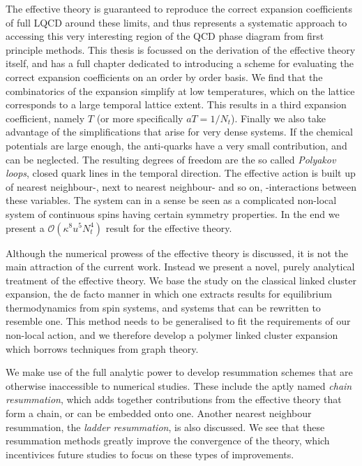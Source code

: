 {The effective theory is guaranteed to reproduce the correct expansion
coefficients of full LQCD around these limits, and thus represents a systematic
approach to accessing this very interesting region of the QCD phase diagram from
first principle methods. This thesis is focussed on the derivation of the
effective theory itself, and has a full chapter dedicated to introducing a
scheme for evaluating the correct expansion coefficients on an order by order
basis. We find that the combinatorics of the expansion simplify at low
temperatures, which on the lattice corresponds to a large temporal lattice
extent. This results in a third expansion coefficient, namely $T$ (or more
specifically $a T = 1/N_t$). Finally we also take advantage of the
simplifications that arise for very dense systems. If the chemical potentials
are large enough, the anti-quarks have a very small contribution, and can be
neglected. The resulting degrees of freedom are the so called \emph{Polyakov
  loops}, closed quark lines in the temporal direction. The effective action is
built up of nearest neighbour-, next to nearest neighbour- and so on,
-interactions between these variables. The system can in a sense be seen as a
complicated non-local system of continuous spins having certain symmetry
properties. In the end we present a $\mathcal{O}(\kappa^8 u^5 N_t^4)$ result for
the effective theory.

Although the numerical prowess of the effective theory is discussed, it is not
the main attraction of the current work. Instead we present a novel, purely
analytical treatment of the effective theory. We base the study on the classical
linked cluster expansion, the de facto manner in which one extracts results for
equilibrium thermodynamics from spin systems, and systems that can be rewritten
to resemble one. This method needs to be generalised to fit the requirements of
our non-local action, and we therefore develop a polymer linked cluster
expansion which borrows techniques from graph theory.

We make use of the full analytic power to develop resummation schemes that are
otherwise inaccessible to numerical studies. These include the aptly named
\emph{chain resummation}, which adds together contributions from the effective
theory that form a chain, or can be embedded onto one. Another nearest neighbour
resummation, the \emph{ladder resummation}, is also discussed. We see that
these resummation methods greatly improve the convergence of the theory, which
incentivices future studies to focus on these types of improvements. 

}
